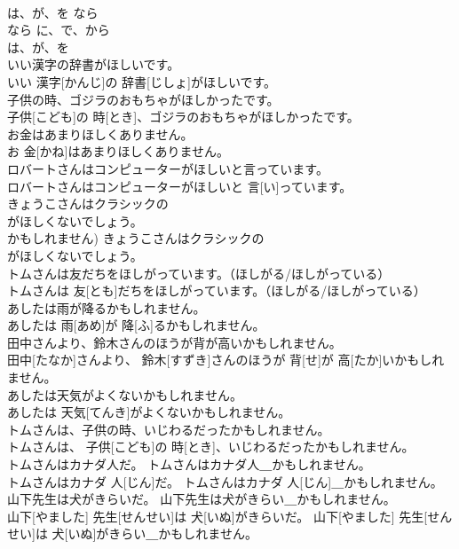 \documentclass[8pt]{extreport}
\begin{document}
\begin{CJK}{UTF8}{min}
\\	は、が、を	なら 
\\	なら に、で、から 
\\	は、が、を	
\\	いい漢字の辞書がほしいです。	
\\	いい 漢字[かんじ]の 辞書[じしょ]がほしいです。	
\\	子供の時、ゴジラのおもちゃがほしかったです。	
\\	子供[こども]の 時[とき]、ゴジラのおもちゃがほしかったです。	
\\	お金はあまりほしくありません。	
\\	お 金[かね]はあまりほしくありません。	
\\	ロバートさんはコンピューターがほしいと言っています。	
\\	ロバートさんはコンピューターがほしいと 言[い]っています。	
\\	きょうこさんはクラシックの
\\	がほしくないでしょう。	
\\	かもしれません)	きょうこさんはクラシックの 
\\	がほしくないでしょう。	
\\	トムさんは友だちをほしがっています。（ほしがる/ほしがっている）	
\\	トムさんは 友[とも]だちをほしがっています。（ほしがる/ほしがっている）	
\\	あしたは雨が降るかもしれません。	
\\	あしたは 雨[あめ]が 降[ふ]るかもしれません。	
\\	田中さんより、鈴木さんのほうが背が高いかもしれません。	
\\	田中[たなか]さんより、 鈴木[すずき]さんのほうが 背[せ]が 高[たか]いかもしれません。	
\\	あしたは天気がよくないかもしれません。	
\\	あしたは 天気[てんき]がよくないかもしれません。	
\\	トムさんは、子供の時、いじわるだったかもしれません。	
\\	トムさんは、 子供[こども]の 時[とき]、いじわるだったかもしれません。	
\\	トムさんはカナダ人だ。 トムさんはカナダ人＿かもしれません。	
\\	トムさんはカナダ 人[じん]だ。 トムさんはカナダ 人[じん]＿かもしれません。	
\\	山下先生は犬がきらいだ。 山下先生は犬がきらい＿かもしれません。	
\\	山下[やました] 先生[せんせい]は 犬[いぬ]がきらいだ。 山下[やました] 先生[せんせい]は 犬[いぬ]がきらい＿かもしれません。	

\end{CJK}
\end{document}
